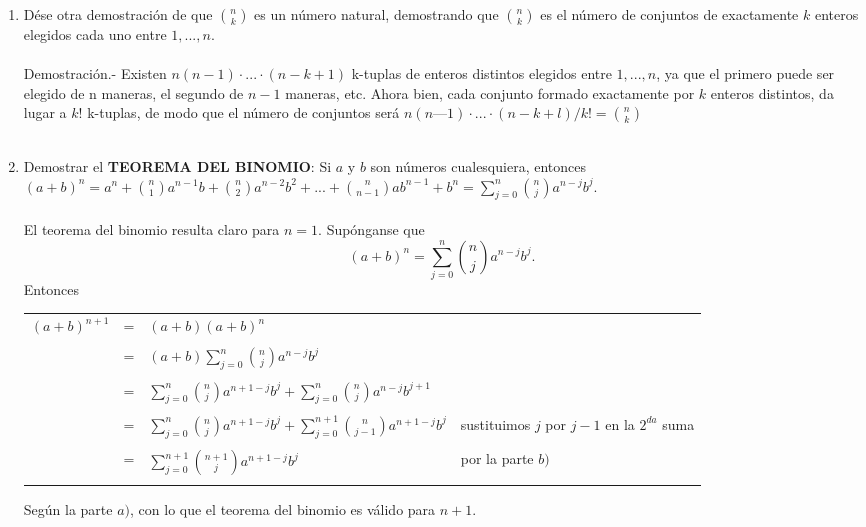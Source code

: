 \begin{enumerate}
\begin{enumerate}[\bfseries (a)]
\item Dése otra demostración de que ${n \choose k}$ es un número natural, demostrando que ${n \choose k}$ es el número de conjuntos de exactamente $k$ enteros elegidos cada uno entre $1,...,n$.\\\\
Demostración.- \; Existen $n(n -1) \cdot ... \cdot (n - k + 1)$ k-tuplas de enteros distintos elegidos entre $1, ..., n$, ya que el primero puede ser elegido de n maneras, el segundo de $n - 1$ maneras, etc. Ahora bien, cada conjunto formado exactamente por $k$ enteros distintos, da lugar a $k!$ k-tuplas, de
modo que el número de conjuntos será $n(n — 1) \cdot ... \cdot (n - k + l)/k! = {n\choose k}$\\\\ 

\item Demostrar el \textbf{TEOREMA DEL BINOMIO}: Si $a$ \; y \; $b$ son números cualesquiera, entonces
$(a+b)^n = a^n + {n \choose 1} a^{n-1} b + {n \choose 2} a^{n-2} b^2 + ... + {n \choose n-1} a b^{n-1} + b^n = \displaystyle \sum_{j=0}^n {n \choose j} a^{n-j} b^j.$\\\\
El teorema del binomio resulta claro para $n=1.$ Supónganse que $$(a+b)^n = \displaystyle \sum_{j=0}^n {n \choose j} a^{n-j} b^j.$$
Entonces 
\begin{center}
\begin{tabular}{r c l l}
$(a+b)^{n+1}$&=&$(a+b)(a+b)^n$&\\\\
&=&$(a+b) \displaystyle \sum_{j=0}^n {n \choose j} a^{n-j} b^j$&\\\\
&=&$\displaystyle \sum_{j=0}^n {n \choose j} a^{n+1-j} b^j + \sum_{j=0}^{n} {n \choose j} a^{n-j} b^{j+1}$&\\\\
&=&$\displaystyle \sum_{j=0}^n {n \choose j} a^{n+1-j} b^j + \sum_{j=0}^{n+1} {n \choose j-1} a^{n+1-j} b^{j}$&sustituimos $j$ por $j-1$ en la $2^{da}$ suma\\\\
&=&$\displaystyle \sum_{j=0}^{n+1} {n+1 \choose j} a^{n+1-j} b^j$& por la parte $b)$\\\\
\end{tabular}
\end{center}
Según la parte $a)$, con lo que el teorema del binomio es válido para $n+1.$\\\\


\end{enumerate}
\end{enumerate}
